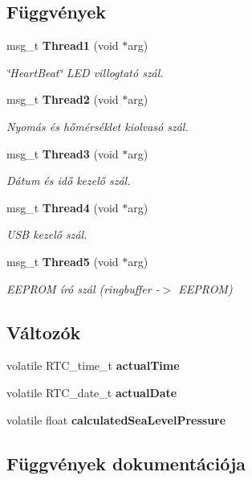 \subsection*{Függvények}
\begin{DoxyCompactItemize}
\item 
msg\-\_\-t {\bf Thread1} (void $\ast$arg)
\begin{DoxyCompactList}\small\item\em \char`\"{}\-Heart\-Beat\char`\"{} L\-E\-D villogtató szál. \end{DoxyCompactList}\item 
msg\-\_\-t {\bf Thread2} (void $\ast$arg)
\begin{DoxyCompactList}\small\item\em Nyomás és hőmérséklet kiolvasó szál. \end{DoxyCompactList}\item 
msg\-\_\-t {\bf Thread3} (void $\ast$arg)
\begin{DoxyCompactList}\small\item\em Dátum és idő kezelő szál. \end{DoxyCompactList}\item 
msg\-\_\-t {\bf Thread4} (void $\ast$arg)
\begin{DoxyCompactList}\small\item\em U\-S\-B kezelő szál. \end{DoxyCompactList}\item 
msg\-\_\-t {\bf Thread5} (void $\ast$arg)
\begin{DoxyCompactList}\small\item\em E\-E\-P\-R\-O\-M író szál (ringbuffer -\/$>$ E\-E\-P\-R\-O\-M) \end{DoxyCompactList}\end{DoxyCompactItemize}
\subsection*{Változók}
\begin{DoxyCompactItemize}
\item 
volatile R\-T\-C\-\_\-time\-\_\-t {\bf actual\-Time}
\item 
volatile R\-T\-C\-\_\-date\-\_\-t {\bf actual\-Date}
\item 
volatile float {\bf calculated\-Sea\-Level\-Pressure}
\end{DoxyCompactItemize}


\subsection{Függvények dokumentációja}
